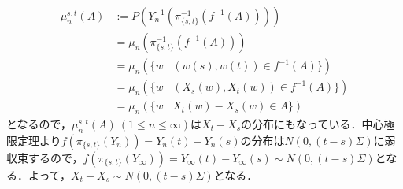 \documentclass[dvipdfmx]{jsarticle}
\begin{document}
\begin{align*}
\mu_n^{s,t}(A)
&:=P(Y_n^{-1}(\pi_{\{s,t\}}^{-1}(f^{-1}(A)))) \\
&=\mu_n(\pi_{\{s,t\}}^{-1}(f^{-1}(A))) \\
&=\mu_n\left(\{w\mid (w(s),w(t))\in f^{-1}(A)\}\right) \\
&=\mu_n\left(\{w\mid (X_s(w),X_t(w))\in f^{-1}(A)\}\right) \\
&=\mu_n\left(\{w\mid X_t(w)-X_s(w)\in A\}\right)
\end{align*}
となるので，$\mu_n^{s,t}(A){\ }(1\leq n\leq \infty)$は$X_t-X_s$の分布にもなっている．中心極限定理より$f(\pi_{\{s,t\}}(Y_n))=Y_n(t)-Y_n(s)$の分布は$N(0,(t-s)\Sigma)$に弱収束するので，$f(\pi_{\{s,t\}}(Y_{\infty}))=Y_{\infty}(t)-Y_{\infty}(s)\sim N(0,(t-s)\Sigma)$となる．よって，$X_t-X_s\sim N(0,(t-s)\Sigma)$となる．
%
%
%
%
\end{document}
